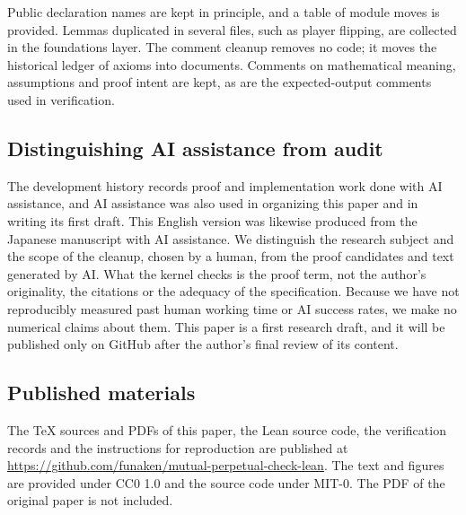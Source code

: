 \documentclass[a4paper,11pt]{article}
\theoremstyle{definition}
\begin{document}
Public declaration names are kept in principle, and a table of module moves is provided.
Lemmas duplicated in several files, such as player flipping, are collected in the foundations layer.
The comment cleanup removes no code; it moves the historical ledger of axioms into documents.
Comments on mathematical meaning, assumptions and proof intent are kept, as are the expected-output comments used in verification.

\subsection{Distinguishing AI assistance from audit}
The development history records proof and implementation work done with AI assistance, and AI assistance was also used in organizing this paper and in writing its first draft.
This English version was likewise produced from the Japanese manuscript with AI assistance.
We distinguish the research subject and the scope of the cleanup, chosen by a human, from the proof candidates and text generated by AI.
What the kernel checks is the proof term, not the author's originality, the citations or the adequacy of the specification.
Because we have not reproducibly measured past human working time or AI success rates, we make no numerical claims about them.
This paper is a first research draft, and it will be published only on GitHub after the author's final review of its content.

\subsection{Published materials}
The TeX sources and PDFs of this paper, the Lean source code, the verification records and the instructions for reproduction are published at \url{https://github.com/funaken/mutual-perpetual-check-lean}.
The text and figures are provided under CC0 1.0 and the source code under MIT-0. The PDF of the original paper is not included.
\end{document}
